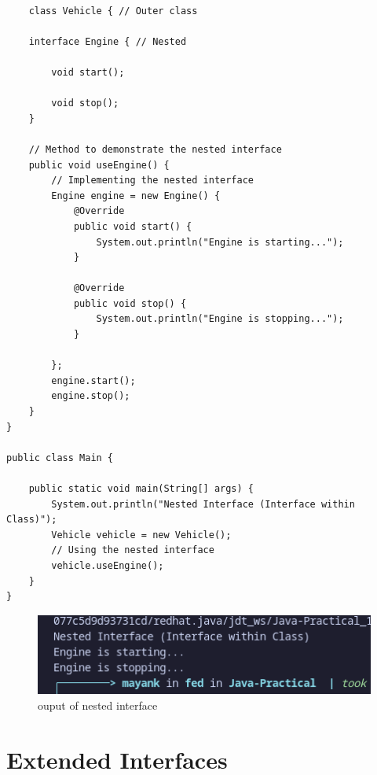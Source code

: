 \documentclass[a4paper,12pt]{article}
\begin{document}
\begin{lstlisting}

    class Vehicle { // Outer class

    interface Engine { // Nested

        void start();

        void stop();
    }

    // Method to demonstrate the nested interface
    public void useEngine() {
        // Implementing the nested interface
        Engine engine = new Engine() {
            @Override
            public void start() {
                System.out.println("Engine is starting...");
            }

            @Override
            public void stop() {
                System.out.println("Engine is stopping...");
            }

        };
        engine.start();
        engine.stop();
    }
}

public class Main {

    public static void main(String[] args) {
        System.out.println("Nested Interface (Interface within Class)");
        Vehicle vehicle = new Vehicle();
        // Using the nested interface
        vehicle.useEngine();
    }
}

\end{lstlisting}
\begin{figure}[H]
    \centering
    \includegraphics[width=0.9\linewidth]{images/NestedInter.png}
    \caption{ouput of nested interface}
    \label{fig:sample_image}
\end{figure}

\section{Extended Interfaces}
\end{document}
